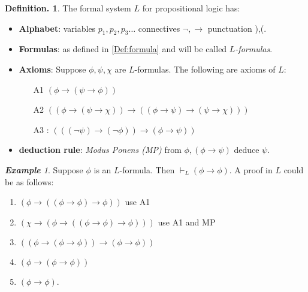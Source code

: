 \documentclass[a4paper,oneside,11pt,DIV=12,parskip=half]{scrartcl}
\theoremstyle{plain}
\theoremstyle{definition}
\newtheorem{definition}[theorem]{Definition.}
\newtheorem{remark, definition}[theorem]{Remark and Definition.}
\newtheorem{lemma, definition}[theorem]{Lemma and Definition.}
\newtheorem{theorem, definition}[theorem]{Theorem and Definition.}
\theoremstyle{remark}
\newtheorem*{example}{\textbf{Example}}
\newtheorem*{remark, example}{\textbf{Remark and Exercise}}
\begin{document}
\begin{definition}
The formal system $L$ for propositional logic has:

\begin{itemize}
    \item \textbf{Alphabet}: variables $p_1,p_2,p_3\dots$  connectives $\lnot,\rightarrow$
    punctuation ),(.
    \item \textbf{Formulas}: as defined in \ref{Def:formula} and will be called \emph{$L$-formulas}.
    \item \textbf{Axioms}: Suppose $\phi,\psi,\chi$ are $L$-formulas. The following are axioms of $L$:
    \begin{itemize}
        \item[A1] $(\phi \rightarrow (\psi \rightarrow \phi))$
        \item[A2] $((\phi \rightarrow (\psi \rightarrow \chi)) \rightarrow ((\phi \rightarrow \psi) \rightarrow (\psi \rightarrow \chi)))$
        \item[A3]: $(((\lnot \psi) \rightarrow ( \lnot \phi)) \rightarrow (\phi \rightarrow \psi))$
    \end{itemize}
    \item \textbf{deduction rule}: \emph{ Modus Ponens (MP)} from $\phi,  (\phi \rightarrow \psi)$ deduce $\psi$.
\end{itemize}

\begin{example}

Suppose $\phi$ is an $L$-formula. Then $\vdash_L (\phi \rightarrow \phi)$.
A proof in $L$ could be as follows:
\begin{enumerate}
    \item $(\phi \rightarrow ((\phi \rightarrow \phi) \rightarrow \phi))$ use A1
    \item $(\chi \rightarrow (\phi \rightarrow ((\phi \rightarrow \phi) \rightarrow \phi)))$ use A1 and MP
    \item $((\phi \rightarrow (\phi \rightarrow \phi)) \rightarrow (\phi \rightarrow \phi))$
    \item $(\phi \rightarrow (\phi \rightarrow \phi))$
    \item $(\phi \rightarrow \phi)$.
\end{enumerate}
\end{example}
\end{definition}
\end{document}
